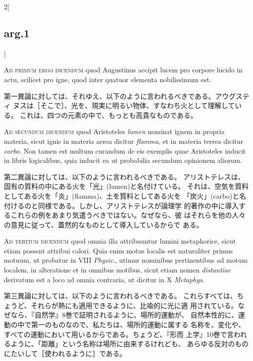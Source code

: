 \documentclass[paper=a4paper,fontsize=10pt,jafontsize=9pt,titlepage]{jlreq}
\begin{document}
\begin{paracol}{2}[\subsection{arg.1}]
\switchcolumn*[\subsection{ad.1}]

{\scshape  Ad primum ergo dicendum} quod Augustinus
accipit lucem pro corpore lucido in actu, scilicet pro igne, quod inter
quatuor elementa nobilissimum est.

\switchcolumn

第一異論に対しては、それゆえ、以下のように言われるべきである。アウグスティ
ヌスは［そこで］、光を、現実に明るい物体、すなわち火として理解している。
これは、四つの元素の中で、もっとも高貴なものである。

\switchcolumn*[\subsection{ad.2}]

{\scshape Ad secundum dicendum} quod Aristoteles {\itshape lumen}
nominat ignem in propria materia, sicut ignis in materia aerea dicitur
{\itshape flamma}, et in materia terrea dicitur {\itshape carbo}. Non
tamen est multum curandum de eis exemplis quae Aristoteles inducit in
libris logicalibus, quia inducit ea ut probabilia secundum opinionem
aliorum.

\switchcolumn

第二異論に対しては、以下のように言われるべきである。
アリストテレスは、固有の質料の中にある火を「光」(lumen)と名付けている。
 それは、空気を質料としてある火を「炎」(flamma)、土を質料としてある火を
 「炭火」(carbo)と名付けるのと同様である。しかし、アリストテレスが論理学
 的著作の中に導入するこれらの例をあまり気遣うべきではない。なぜなら、彼
 はそれらを他の人々の意見に従って、蓋然的なものとして導入しているからで
 ある。

\switchcolumn*[\subsection{ad.3}]

{\scshape Ad tertium dicendum} quod omnia illa
attribuuntur lumini metaphorice, sicut etiam possent attribui
calori. Quia enim motus localis est naturaliter primus motuum, ut
probatur in VIII {\itshape Physic}., utimur nominibus pertinentibus ad motum
localem, in alteratione et in omnibus motibus, sicut etiam nomen
{\itshape distantiae} derivatum est a loco ad omnia contraria, ut dicitur in X
{\itshape Metaphys}.

\switchcolumn

第三異論に対しては、以下のように言われるべきである。
これらすべては、ちょうど、それらが熱にも適用できるように、比喩的に光に適
 用されている。なぜなら、『自然学』8巻で証明されるように、場所的運動が、
 自然本性的に、運動の中で第一のものなので、私たちは、場所的運動に属する
 名称を、変化や、すべての運動において用いるからである。ちょうど、『形而
 上学』10巻で言われるように、「距離」という名称は場所に由来するけれども、
 あらゆる反対のものにたいして［使われるように］である。

\end{paracol}
\end{document}
